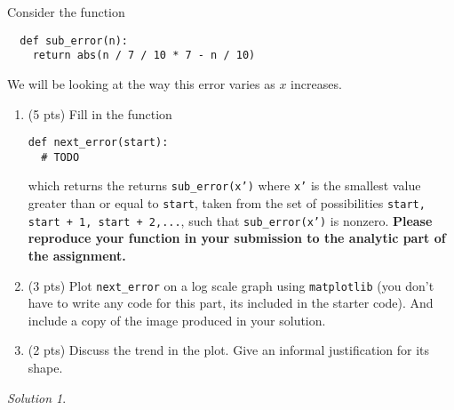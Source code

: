 \documentclass{article}
\theoremstyle{remark}
\newtheorem*{solution}{Solution}
\begin{document}
Consider the function
\begin{lstlisting}
  def sub_error(n):
    return abs(n / 7 / 10 * 7 - n / 10)
\end{lstlisting}
We will be looking at the way this error varies as $x$ increases.
\begin{enumerate}
\item (5 pts) Fill in the function
\begin{lstlisting}
def next_error(start):
  # TODO
\end{lstlisting}
which returns the returns \texttt{sub\_error(x')} where \texttt{x'} is the smallest value greater than or equal to \texttt{start}, taken from the set of possibilities \texttt{start, start + 1, start + 2,...}, such that \texttt{sub\_error(x')} is nonzero.
\textbf{Please reproduce your function in your submission to the analytic part of the assignment.}

\item (3 pts) Plot \texttt{next\_error} on a log scale graph using \texttt{matplotlib} (you don't have to write any code for this part, its included in the starter code). And include a copy of the image produced in your solution.

\item (2 pts) Discuss the trend in the plot. Give an informal justification for its shape.
\end{enumerate}

\begin{solution}
\end{solution}
\end{document}

